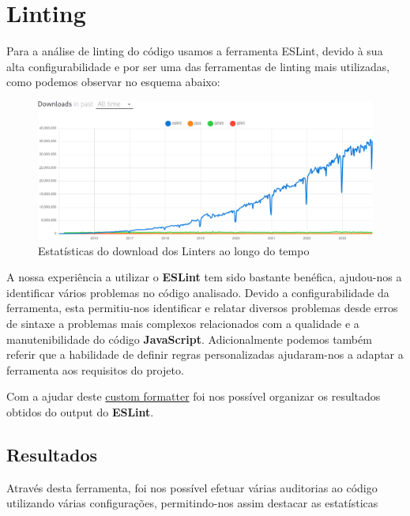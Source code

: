 \documentclass[a4paper,12pt]{article} %
\begin{document}
\newpage
\section{Linting}
Para a análise de linting do código usamos a ferramenta ESLint, devido à sua alta configurabilidade e por ser uma das ferramentas de linting mais utilizadas, como podemos observar no esquema abaixo:

\vspace{1cm}
\begin{figure}[H]
	\centering
	\includegraphics[scale=1.5]{images/lintTrend.png}
	\caption[Estatísticas de Download de Linters]{Estatísticas do download dos Linters ao longo do tempo\footnotemark}
\end{figure}
\vspace{1cm}

A nossa experiência a utilizar o \textbf{ESLint} tem sido bastante benéfica, ajudou-nos a identificar vários problemas no código analisado. Devido a configurabilidade da ferramenta, esta permitiu-nos identificar e relatar diversos problemas desde erros de sintaxe a problemas mais complexos relacionados com a qualidade e a manutenibilidade do código \textbf{JavaScript}. Adicionalmente podemos também referir que a habilidade de definir regras personalizadas ajudaram-nos a adaptar a ferramenta aos requisitos do projeto.

Com a ajudar deste \href{https://stackoverflow.com/a/62453095}{custom formatter} foi nos possível organizar os resultados obtidos do output do \textbf{ESLint}.

\newpage
\subsection{Resultados}
Através desta ferramenta, foi nos possível efetuar várias auditorias ao código utilizando várias configurações, permitindo-nos assim destacar as estatísticas
\end{document}
